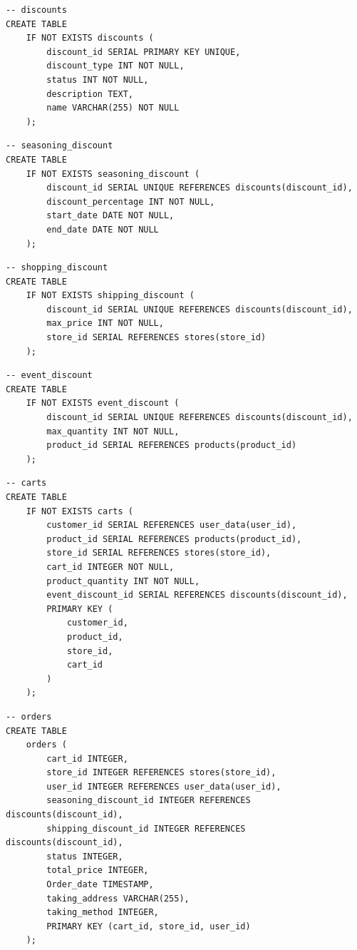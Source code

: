 \documentclass[a4paper, 12pt]{article}
\begin{document}
\begin{lstlisting}
-- discounts
CREATE TABLE
    IF NOT EXISTS discounts (
        discount_id SERIAL PRIMARY KEY UNIQUE,
        discount_type INT NOT NULL,
        status INT NOT NULL,
        description TEXT,
        name VARCHAR(255) NOT NULL
    );
\end{lstlisting}

\begin{lstlisting}
-- seasoning_discount
CREATE TABLE
    IF NOT EXISTS seasoning_discount (
        discount_id SERIAL UNIQUE REFERENCES discounts(discount_id),
        discount_percentage INT NOT NULL,
        start_date DATE NOT NULL,
        end_date DATE NOT NULL
    );
\end{lstlisting}

\begin{lstlisting}
-- shopping_discount
CREATE TABLE
    IF NOT EXISTS shipping_discount (
        discount_id SERIAL UNIQUE REFERENCES discounts(discount_id),
        max_price INT NOT NULL,
        store_id SERIAL REFERENCES stores(store_id)
    );
\end{lstlisting}

\begin{lstlisting}
-- event_discount
CREATE TABLE
    IF NOT EXISTS event_discount (
        discount_id SERIAL UNIQUE REFERENCES discounts(discount_id),
        max_quantity INT NOT NULL,
        product_id SERIAL REFERENCES products(product_id)
    );
\end{lstlisting}

\begin{lstlisting}
-- carts
CREATE TABLE
    IF NOT EXISTS carts (
        customer_id SERIAL REFERENCES user_data(user_id),
        product_id SERIAL REFERENCES products(product_id),
        store_id SERIAL REFERENCES stores(store_id),
        cart_id INTEGER NOT NULL,
        product_quantity INT NOT NULL,
        event_discount_id SERIAL REFERENCES discounts(discount_id),
        PRIMARY KEY (
            customer_id,
            product_id,
            store_id,
            cart_id
        )
    );
\end{lstlisting}

\begin{lstlisting}
-- orders
CREATE TABLE
    orders (
        cart_id INTEGER,
        store_id INTEGER REFERENCES stores(store_id),
        user_id INTEGER REFERENCES user_data(user_id),
        seasoning_discount_id INTEGER REFERENCES discounts(discount_id),
        shipping_discount_id INTEGER REFERENCES discounts(discount_id),
        status INTEGER,
        total_price INTEGER,
        Order_date TIMESTAMP,
        taking_address VARCHAR(255),
        taking_method INTEGER,
        PRIMARY KEY (cart_id, store_id, user_id)
    );
\end{lstlisting}
\end{document}
